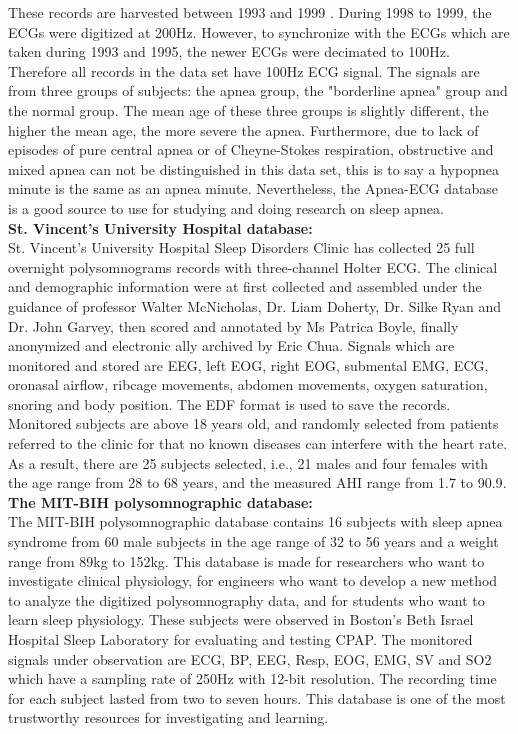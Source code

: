         These records are harvested between 1993 and 1999 \citep{APNEA_ECGDB}. During 1998 to 1999, the ECGs were digitized at 200Hz. However, to synchronize with the ECGs which are taken during 1993 and 1995, the newer ECGs were decimated to 100Hz. Therefore all records in the data set have 100Hz ECG signal. The signals are from three groups of subjects: the apnea group, the "borderline apnea" group and the normal group. The mean age of these three groups is slightly different, the higher the mean age, the more severe the apnea. Furthermore, due to lack of episodes of pure central apnea or of Cheyne-Stokes respiration, obstructive and mixed apnea can not be distinguished in this data set, this is to say a hypopnea minute is the same as an apnea minute. Nevertheless, the Apnea-ECG database is a good source to use for studying and doing research on sleep apnea.\\
        \textbf{St. Vincent's University Hospital database: }\\
        St. Vincent's University Hospital Sleep Disorders Clinic has collected 25 full overnight polysomnograms records with three-channel Holter ECG. The clinical and demographic information were at first collected and assembled under the guidance of professor Walter McNicholas, Dr. Liam Doherty, Dr. Silke Ryan and Dr. John Garvey, then scored and annotated by Ms Patrica Boyle, finally anonymized and electronic ally archived by Eric Chua. Signals which are monitored and stored are EEG, left EOG, right EOG, submental EMG, ECG, oronasal airflow, ribcage movements, abdomen movements, oxygen saturation, snoring and body position. The EDF format is used to save the records. Monitored subjects are above 18 years old, and randomly selected from patients referred to the clinic for that no known diseases can interfere with the heart rate. As a result, there are 25 subjects selected, i.e., 21 males and four females with the age range from 28 to 68 years, and the measured AHI range from 1.7 to 90.9\citep{STVinceUniversity}.\\
        \textbf{The MIT-BIH polysomnographic database: }\\
        The MIT-BIH polysomnographic database contains 16 subjects with sleep apnea syndrome from 60 male subjects in the age range of 32 to 56 years and a weight range from 89kg to 152kg\citep{MIT_BIH_slpdb}. This database is made for researchers who want to investigate clinical physiology, for engineers who want to develop a new method to analyze the digitized polysomnography data, and for students who want to learn sleep physiology. These subjects were observed in Boston's Beth Israel Hospital Sleep Laboratory for evaluating and testing CPAP. The monitored signals under observation are ECG, BP, EEG, Resp, EOG, EMG, SV and SO2 which have a sampling rate of 250Hz with 12-bit resolution. The recording time for each subject lasted from two to seven hours. This database is one of the most trustworthy resources for investigating and learning.\\
